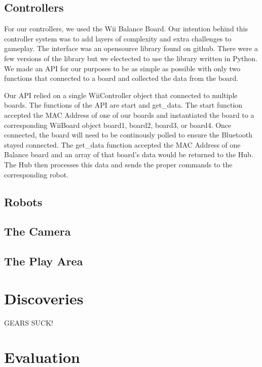 \documentclass[11pt]{ieeeconf}
\begin{document}
\subsection{Controllers}
For our controllers, we used the Wii Balance Board. Our intention behind this controller system was to add layers of complexity and extra challenges to gameplay. The interface was an opensource library found on github. There were a few versions of the library but we electected to use the library written in Python. We made an API for our purposes to be as simple as possible with only two functions that connected to a board and collected the data from the board.

Our API relied on a single WiiController object that connected to multiple boards. The functions of the API are start and get\_data. The start function accepted the MAC Address of one of our boards and instantiated the board to a corresponding WiiBoard object board1, board2, board3, or board4. Once connected, the board will need to be continously polled to ensure the Bluetooth stayed connected. The get\_data function accepted the MAC Address of one Balance board and an array of that board's data would be returned to the Hub. The Hub then processes this data and sends the proper commands to the corresponding robot.
\subsection{Robots}

\subsection{The Camera}

\subsection{The Play Area}

\section{Discoveries}

GEARS SUCK!

\section{Evaluation}
\end{document}
